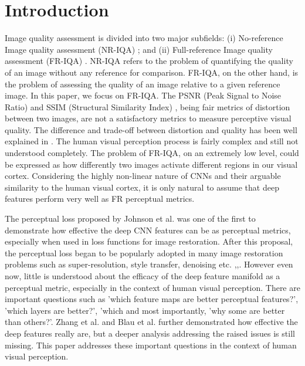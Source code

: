 \documentclass[10pt,twocolumn,letterpaper]{article}
\begin{document}
\section{Introduction}
    Image quality assessment is divided into two major subfields: (i) No-reference Image quality assessment (NR-IQA) \cite{3}; and (ii) Full-reference Image quality assessment (FR-IQA) \cite{4}. NR-IQA refers to the problem of quantifying the quality of an image without any reference for comparison. FR-IQA, on the other hand, is the problem of assessing the quality of an image relative to a given reference image. In this paper, we focus on FR-IQA. The PSNR (Peak Signal to Noise Ratio) and SSIM (Structural Similarity Index) \cite{6}, being fair metrics of distortion between two images, are not a satisfactory metrics to measure perceptive visual quality. The difference and trade-off between distortion and quality has been well explained in \cite{5}. The human visual perception process is fairly complex and still not understood completely. The problem of FR-IQA, on an extremely low level, could be expressed as how differently two images activate different regions in our visual cortex. Considering the highly non-linear nature of CNNs and their arguable similarity to the human visual cortex, it is only natural to assume that deep features perform very well as FR perceptual metrics. 
    
    The perceptual loss proposed by Johnson et al. \cite{7} was one of the first to demonstrate how effective the deep CNN features can be as perceptual metrics, especially when used in loss functions for image restoration. After this proposal, the perceptual loss began to be popularly adopted in many image restoration problems such as super-resolution, style transfer, denoising etc. \cite{9},\cite{10},\cite{11}. However even now, little is understood about the efficacy of the deep feature manifold as a perceptual metric, especially in the context of human visual perception. There are important questions such as 'which feature maps are better perceptual features?', 'which layers are better?', 'which and most importantly, 'why some are better than others?'. Zhang et al. \cite{12} and Blau et al. \cite{5} further demonstrated how effective the deep features really are, but a deeper analysis addressing the raised issues is still missing. This paper addresses these important questions in the context of human visual perception. 
    
\end{document}
